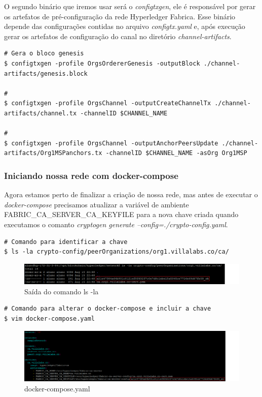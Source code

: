 \documentclass[a4paper,11pt]{article}
\begin{document}
O segundo binário que iremos usar será o \textit{configtxgen}, ele é responsável por gerar os artefatos de pré-configuração da rede Hyperledger\cite{hyperledger} Fabrica\cite{hyperledgerfabric}. Esse binário depende das configurações contidas no arquivo \textit{configtx.yaml} e, após execução gerar os artefatos de configuração do canal no diretório \textit{channel-artifacts}.
\begin{lstlisting}
# Gera o bloco genesis
$ configtxgen -profile OrgsOrdererGenesis -outputBlock ./channel-artifacts/genesis.block

#
$ configtxgen -profile OrgsChannel -outputCreateChannelTx ./channel-artifacts/channel.tx -channelID $CHANNEL_NAME

#
$ configtxgen -profile OrgsChannel -outputAnchorPeersUpdate ./channel-artifacts/Org1MSPanchors.tx -channelID $CHANNEL_NAME -asOrg Org1MSP
\end{lstlisting}

\subsubsection{Iniciando nossa rede com docker-compose}
Agora estamos perto de finalizar a criação de nossa rede, mas antes de executar o \textit{docker-compose} precisamos atualizar a variável de ambiente FABRIC\_CA\_SERVER\_CA\_KEYFILE para a nova chave criada quando executamos o comanto \textit{cryptogen generate --config=./crypto-config.yaml}.

\begin{lstlisting}
# Comando para identificar a chave
$ ls -la crypto-config/peerOrganizations/org1.villalabs.co/ca/
\end{lstlisting}
\begin{figure}[H]
  \centering
  \includegraphics[width=1.1\textwidth]{imagens/env-key.png}
  \caption{Saída do comando ls -la}
\end{figure}

\begin{lstlisting}
# Comando para alterar o docker-compose e incluir a chave 
$ vim docker-compose.yaml
\end{lstlisting}
\begin{figure}[H]
  \centering
  \includegraphics[width=1.1\textwidth]{imagens/env-key-compose.png}
  \caption{docker-compose.yaml}
\end{figure}
\end{document}
